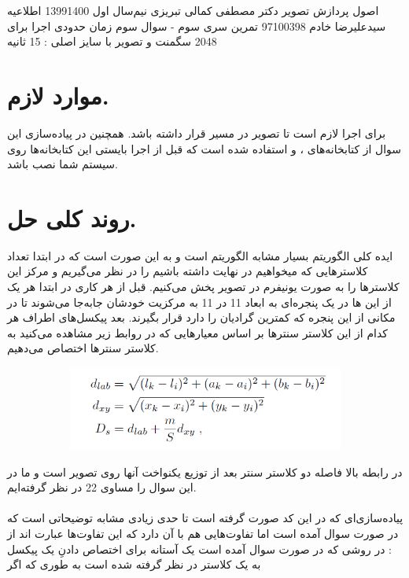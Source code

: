 \documentclass[a4paper,12pt]{article}
\begin{document}
\handout
{اصول پردازش تصویر}
{دکتر مصطفی کمالی تبریزی}
{نیم‌سال اول 1399\lr{-}1400}
{اطلاعیه}
{سیدعلیرضا خادم}
{97100398}
{تمرین سری سوم - سوال سوم}
زمان حدودی اجرا برای 2048 سگمنت و تصویر با سایز اصلی : 15 ثانیه
\section*{موارد لازم.}
برای اجرا لازم است تا تصویر
در مسیر
قرار داشته باشد. همچنین در پیاده‌سازی این سوال از کتابخانه‌های 
،
و
استفاده شده است که قبل از اجرا بایستی این کتابخانه‌ها روی سیستم شما نصب باشد.
\section*{روند کلی حل.}
ایده کلی الگوریتم 
بسیار مشابه الگوریتم 
است و به این صورت است که در ابتدا تعداد کلاسترهایی که میخواهیم در نهایت داشته باشیم را در نظر می‌گیریم و مرکز این کلاسترها را به صورت یونیفرم در تصویر پخش می‌کنیم. قبل از هر کاری در ابتدا هر یک از این 
ها در یک پنجره‌ای به ابعاد 11 در 11 به مرکزیت خودشان جابه‌جا می‌شوند تا در مکانی از این پنجره که کمترین گرادیان را دارد قرار بگیرند. بعد پیکسل‌های اطراف هر کدام از این کلاستر سنترها بر اساس معیار‌هایی که در روابط زیر مشاهده می‌کنید به کلاستر سنترها اختصاص می‌دهیم.
\begin{figure}[H]
	\centering
	\begin{subfigure}{0.6\textwidth}
		\centering
		\includegraphics[width=\textwidth]{1.png}
	\end{subfigure}
\end{figure}
در رابطه بالا 
فاصله دو کلاستر سنتر بعد از توزیع یکنواخت آنها روی تصویر است و ما در این سوال 
را مساوی 22 در نظر گرفته‌ایم.\\\\
پیاده‌سازی‌ای که در این کد صورت گرفته است تا حدی زیادی مشابه توضیحاتی است که در صورت سوال آمده است اما تفاوت‌هایی هم با آن دارد که این تفاوت‌ها عبارت اند از :	 در روشی که در صورت سوال آمده است یک آستانه برای اختصاص دادنِ یک پیکسل به یک کلاستر در نظر گرفته شده است به طوری که اگر 
\end{document}

